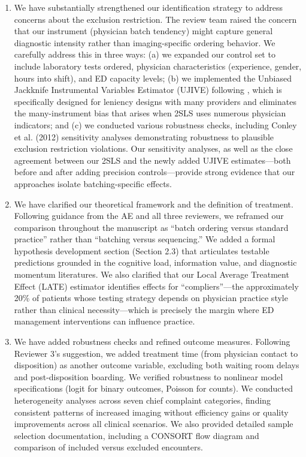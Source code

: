 \documentclass[11pt]{article}
\newcommand{\1}{\hbox{\rm 1\kern-.35em 1}}
\begin{document}
\begin{enumerate}
\item We have substantially strengthened our identification strategy to address concerns about the exclusion restriction. The review team raised the concern that our instrument (physician batch tendency) might capture general diagnostic intensity rather than imaging-specific ordering behavior. We carefully address this in three ways: (a) we expanded our control set to include laboratory tests ordered, physician characteristics (experience, gender, hours into shift), and ED capacity levels; (b) we implemented the Unbiased Jackknife Instrumental Variables Estimator (UJIVE) following \cite{goldsmithpinkham2025leniencydesignsoperatorsmanual}, which is specifically designed for leniency designs with many providers and eliminates the many-instrument bias that arises when 2SLS uses numerous physician indicators; and (c) we conducted various robustness checks, including Conley et al. (2012) sensitivity analyses demonstrating robustness to plausible exclusion restriction violations. Our sensitivity analyses, as well as the close agreement between our 2SLS and the newly added UJIVE estimates---both before and after adding precision controls---provide strong evidence that our approaches isolate batching-specific effects.
\item We have clarified our theoretical framework and the definition of treatment. Following guidance from the AE and all three reviewers, we reframed our comparison throughout the manuscript as ``batch ordering versus standard practice'' rather than ``batching versus sequencing.'' We added a formal hypothesis development section (Section 2.3) that articulates testable predictions grounded in the cognitive load, information value, and diagnostic momentum literatures. We also clarified that our Local Average Treatment Effect (LATE) estimator identifies effects for ``compliers''---the approximately 20\% of patients whose testing strategy depends on physician practice style rather than clinical necessity---which is precisely the margin where ED management interventions can influence practice.
\item We have added robustness checks and refined outcome measures. Following Reviewer 3's suggestion, we added treatment time (from physician contact to disposition) as another outcome variable, excluding both waiting room delays and post-disposition boarding. We verified robustness to nonlinear model specifications (logit for binary outcomes, Poisson for counts). We conducted heterogeneity analyses across seven chief complaint categories, finding consistent patterns of increased imaging without efficiency gains or quality improvements across all clinical scenarios. We also provided detailed sample selection documentation, including a CONSORT flow diagram and comparison of included versus excluded encounters.

\end{enumerate}
\end{document}
